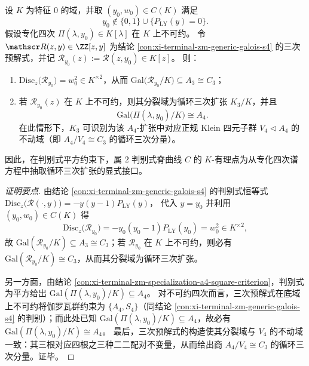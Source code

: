 \begin{conclusion}\label{con:xi-terminal-zm-specialization-a4-c3-resolvent}
设 \(K\) 为特征 \(0\) 的域，并取 \((y_{0},w_{0})\in C(K)\) 满足
\[
y_{0}\notin \{0,1\}\cup\{P_{\mathrm{LY}}(y)=0\}.
\]
假设专化四次 \(\Pi(\lambda,y_{0})\in K[\lambda]\) 在 \(K\) 上不可约。
令 \(\mathscr R(z,y)\in\ZZ[z,y]\) 为结论 \ref{con:xi-terminal-zm-generic-galois-s4} 的三次预解式，并记 \(\mathscr R_{y_{0}}(z):=\mathscr R(z,y_{0})\in K[z]\)。
则：
\begin{enumerate}
  \item \(\mathrm{Disc}_{z}\bigl(\mathscr R_{y_{0}}\bigr)=w_{0}^{2}\in K^{\times 2}\)，从而 \(\mathrm{Gal}\bigl(\mathscr R_{y_{0}}/K\bigr)\subseteq A_{3}\cong C_{3}\)；
  \item 若 \(\mathscr R_{y_{0}}(z)\) 在 \(K\) 上不可约，则其分裂域为循环三次扩张 \(K_{3}/K\)，并且
  \[
  \mathrm{Gal}\bigl(\Pi(\lambda,y_{0})/K\bigr)\cong A_{4}.
  \]
  在此情形下，\(K_{3}\) 可识别为该 \(A_{4}\)-扩张中对应正规 Klein 四元子群 \(V_{4}\triangleleft A_{4}\) 的不动域（即 \(A_{4}/V_{4}\cong C_{3}\) 的循环三次分量）。
\end{enumerate}
因此，在判别式平方约束下，属 \(2\) 判别式脊曲线 \(C\) 的 \(K\)-有理点为从专化四次谱方程中抽取循环三次扩张的显式接口。
\end{conclusion}
\begin{proof}[证明要点]
由结论 \ref{con:xi-terminal-zm-generic-galois-s4} 的判别式恒等式
\(
\mathrm{Disc}_{z}\bigl(\mathscr R(\cdot,y)\bigr)=-y(y-1)P_{\mathrm{LY}}(y)
\)，
代入 \(y=y_{0}\) 并利用 \((y_{0},w_{0})\in C(K)\) 得
\[
\mathrm{Disc}_{z}\bigl(\mathscr R_{y_{0}}\bigr)=-y_{0}(y_{0}-1)P_{\mathrm{LY}}(y_{0})=w_{0}^{2}\in K^{\times 2},
\]
故 \(\mathrm{Gal}(\mathscr R_{y_{0}}/K)\subseteq A_{3}\cong C_{3}\)；若 \(\mathscr R_{y_{0}}\) 在 \(K\) 上不可约，则必有 \(\mathrm{Gal}(\mathscr R_{y_{0}}/K)\cong C_{3}\)，从而其分裂域为循环三次扩张。
\par
另一方面，由结论 \ref{con:xi-terminal-zm-specialization-a4-square-criterion}，判别式为平方给出
\(
\mathrm{Gal}(\Pi(\lambda,y_{0})/K)\subseteq A_{4}
\)。
对不可约四次而言，三次预解式在底域上不可约将伽罗瓦群约束为 \(\{A_{4},S_{4}\}\)（同结论 \ref{con:xi-terminal-zm-generic-galois-s4} 的判别）；而此处已知 \(\mathrm{Gal}(\Pi(\lambda,y_{0})/K)\subseteq A_{4}\)，故必有
\(
\mathrm{Gal}(\Pi(\lambda,y_{0})/K)\cong A_{4}
\)。
最后，三次预解式的构造使其分裂域与 \(V_{4}\) 的不动域一致：其三根对应四根之三种二二配对不变量，从而给出商 \(A_{4}/V_{4}\cong C_{3}\) 的循环三次分量。证毕。
\end{proof}

